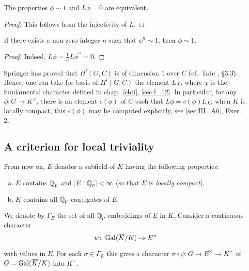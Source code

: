 \begin{subappendices}
\begin{prop}\label{prop:III_A2_3}
	The properties $\phi \sim 1$ and $L\bar{\phi} = 0$ are equivalent.
\end{prop}
\begin{proof}
This follows from the injectivity of $L$.
\end{proof}

\begin{corp}
If there exists a non-zero integer $n$ such that $\phi^n \sim 1$, then $\phi
\sim 1$.
\end{corp}
\begin{proof}
Indeed, $L\bar{\phi} = \frac{1}{n} L\bar{\phi}^n = 0$.
\end{proof}

\begin{obs}
Springer has proved that $H^l(G,C)$ is of dimension $1$ over $C$
(cf.\ Tate \cite{39}, \S3.3). Hence,
one can take for basis of $H^l(G,C)$ the element $L\bar{\chi}$, where $\chi$ is
the fundamental character defined in chap.~\ref{ch:i}, \ref{sec:I_12}.
In particular, for any $\phi \colon G \to K^\times$, there is an element
$c(\phi)$ of $C$ such that $L\bar{\phi} = c(\phi)L\bar{\chi}$; when $K$ is
locally compact, this $c(\phi)$ may be computed explicitly, see
\ref{sec:III_A6}, Exer. 2.
\end{obs}

\subsection{A criterion for local triviality}
\label{sec:III_A3}

From now on, $E$ denotes a subfield of $K$ having the following properties: 
\begin{enumerate}[(a)]
\item $E$ contains $\mathbb{Q}_p$ and $[E : \mathbb{Q}_p] < \infty$ (so that $E$ is \emph{locally
compact}).
\item $K$ contains all $\mathbb{Q}_p$-conjugates of $E$.
\end{enumerate}

We denote by $\Gamma_E$ the set of all $\mathbb{Q}_p$-embeddings of $E$ in $K$. Consider
a continuous character
\[
	\psi \colon \operatorname{Gal}(\overline{K}/K) \rightarrow E^\times
\]

with values in $E$. For each $\sigma \in \Gamma_E$ this gives a character
$\sigma \circ \psi \colon G \to E^\times \to K^\times$ of $G =
\operatorname{Gal}(\overline{K}/K)$ into $K^\times$.


\end{subappendices}
